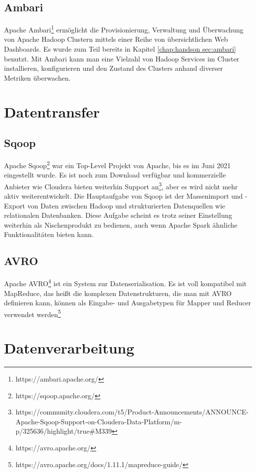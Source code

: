 \subsection{Ambari}
Apache Ambari\footnote{https://ambari.apache.org/} ermöglicht die Provisionierung, Verwaltung und Überwachung von Apache Hadoop Clustern mittels einer Reihe von übersichtlichen Web Dashboards. Es wurde zum Teil bereits in Kapitel \ref{chap:handson sec:ambari} benutzt. Mit Ambari kann man eine Vielzahl von Hadoop Services im Cluster installieren, konfigurieren und den Zustand des Clusters anhand diverser Metriken überwachen.

\section{Datentransfer}
\subsection{Sqoop}
Apache Sqoop\footnote{https://sqoop.apache.org/} war ein Top-Level Projekt von Apache, bis es im Juni 2021 eingestellt wurde. Es ist noch zum Download verfügbar und kommerzielle Anbieter wie Cloudera bieten weiterhin Support an\footnote{https://community.cloudera.com/t5/Product-Announcements/ANNOUNCE-Apache-Sqoop-Support-on-Cloudera-Data-Platform/m-p/325636/highlight/true\#M339}, aber es wird nicht mehr aktiv weiterentwickelt. Die Hauptaufgabe von Sqoop ist der Massenimport und -Export von Daten zwischen Hadoop und strukturierten Datenquellen wie relationalen Datenbanken. Diese Aufgabe scheint es trotz seiner Einstellung weiterhin als Nischenprodukt zu bedienen, auch wenn Apache Spark ähnliche Funktionalitäten bieten kann.\cite{cloudera_moderator_using_2021} 
\subsection{AVRO}
Apache AVRO\footnote{https://avro.apache.org/} ist ein System zur Datenserialisation. Es ist voll kompatibel mit MapReduce, das heißt die komplexen Datenstrukturen, die man mit AVRO definieren kann, können als Eingabe- und Ausgabetypen für Mapper und Reducer verwendet werden\footnote{https://avro.apache.org/docs/1.11.1/mapreduce-guide/}

\section{Datenverarbeitung}
